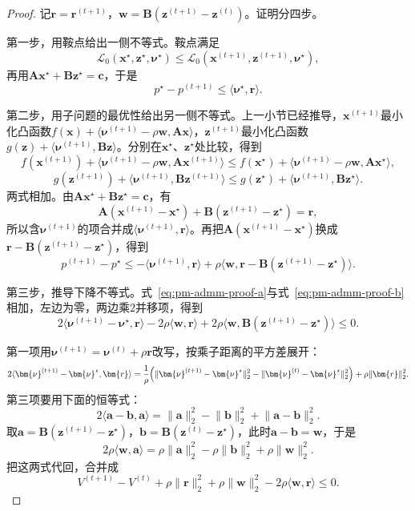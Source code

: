 \begin{proof}
记$\bm{r}=\bm{r}^{(t+1)}$，$\bm{w}=\bm{B}(\bm{z}^{(t+1)}-\bm{z}^{(t)})$。证明分四步。

第一步，用鞍点给出一侧不等式。鞍点满足
\[
 \mathcal{L}_0(\bm{x}^\star,\bm{z}^\star,\bm{\nu}^\star)\leq\mathcal{L}_0(\bm{x}^{(t+1)},\bm{z}^{(t+1)},\bm{\nu}^\star),
\]
再用$\bm{A}\bm{x}^\star+\bm{B}\bm{z}^\star=\bm{c}$，于是
\begin{equation}
 p^\star-p^{(t+1)}\leq\langle\bm{\nu}^\star,\bm{r}\rangle .
 \label{eq:pm-admm-proof-a}
\end{equation}

第二步，用子问题的最优性给出另一侧不等式。上一小节已经推导，$\bm{x}^{(t+1)}$最小化凸函数$f(\bm{x})+\langle\bm{\nu}^{(t+1)}-\rho\bm{w},\bm{A}\bm{x}\rangle$，$\bm{z}^{(t+1)}$最小化凸函数$g(\bm{z})+\langle\bm{\nu}^{(t+1)},\bm{B}\bm{z}\rangle$。分别在$\bm{x}^\star$、$\bm{z}^\star$处比较，得到
\[
 f(\bm{x}^{(t+1)})+\langle\bm{\nu}^{(t+1)}-\rho\bm{w},\bm{A}\bm{x}^{(t+1)}\rangle\leq f(\bm{x}^\star)+\langle\bm{\nu}^{(t+1)}-\rho\bm{w},\bm{A}\bm{x}^\star\rangle,
\]
\[
 g(\bm{z}^{(t+1)})+\langle\bm{\nu}^{(t+1)},\bm{B}\bm{z}^{(t+1)}\rangle\leq g(\bm{z}^\star)+\langle\bm{\nu}^{(t+1)},\bm{B}\bm{z}^\star\rangle .
\]
两式相加。由$\bm{A}\bm{x}^\star+\bm{B}\bm{z}^\star=\bm{c}$，有
\[
 \bm{A}(\bm{x}^{(t+1)}-\bm{x}^\star)+\bm{B}(\bm{z}^{(t+1)}-\bm{z}^\star)=\bm{r},
\]
所以含$\bm{\nu}^{(t+1)}$的项合并成$\langle\bm{\nu}^{(t+1)},\bm{r}\rangle$。再把$\bm{A}(\bm{x}^{(t+1)}-\bm{x}^\star)$换成$\bm{r}-\bm{B}(\bm{z}^{(t+1)}-\bm{z}^\star)$，得到
\begin{equation}
 p^{(t+1)}-p^\star\leq-\langle\bm{\nu}^{(t+1)},\bm{r}\rangle+\rho\langle\bm{w},\bm{r}-\bm{B}(\bm{z}^{(t+1)}-\bm{z}^\star)\rangle .
 \label{eq:pm-admm-proof-b}
\end{equation}

第三步，推导下降不等式。式~\eqref{eq:pm-admm-proof-a}与式~\eqref{eq:pm-admm-proof-b}相加，左边为零，两边乘$2$并移项，得到
\[
 2\langle\bm{\nu}^{(t+1)}-\bm{\nu}^\star,\bm{r}\rangle-2\rho\langle\bm{w},\bm{r}\rangle+2\rho\langle\bm{w},\bm{B}(\bm{z}^{(t+1)}-\bm{z}^\star)\rangle\leq0 .
\]

第一项用$\bm{\nu}^{(t+1)}=\bm{\nu}^{(t)}+\rho\bm{r}$改写，按乘子距离的平方差展开：
\[
 2\langle\bm{\nu}^{(t+1)}-\bm{\nu}^\star,\bm{r}\rangle
 =\frac1\rho\Bigl(\lVert\bm{\nu}^{(t+1)}-\bm{\nu}^\star\rVert_2^2-\lVert\bm{\nu}^{(t)}-\bm{\nu}^\star\rVert_2^2\Bigr)+\rho\lVert\bm{r}\rVert_2^2 .
\]
第三项要用下面的恒等式：
\[
 2\langle\bm{a}-\bm{b},\bm{a}\rangle=\lVert\bm{a}\rVert_2^2-\lVert\bm{b}\rVert_2^2+\lVert\bm{a}-\bm{b}\rVert_2^2 .
\]
取$\bm{a}=\bm{B}(\bm{z}^{(t+1)}-\bm{z}^\star)$，$\bm{b}=\bm{B}(\bm{z}^{(t)}-\bm{z}^\star)$，此时$\bm{a}-\bm{b}=\bm{w}$，于是
\[
 2\rho\langle\bm{w},\bm{a}\rangle=\rho\lVert\bm{a}\rVert_2^2-\rho\lVert\bm{b}\rVert_2^2+\rho\lVert\bm{w}\rVert_2^2 .
\]
把这两式代回，合并成
\[
 V^{(t+1)}-V^{(t)}+\rho\lVert\bm{r}\rVert_2^2+\rho\lVert\bm{w}\rVert_2^2-2\rho\langle\bm{w},\bm{r}\rangle\leq0 .
\]


\end{proof}
